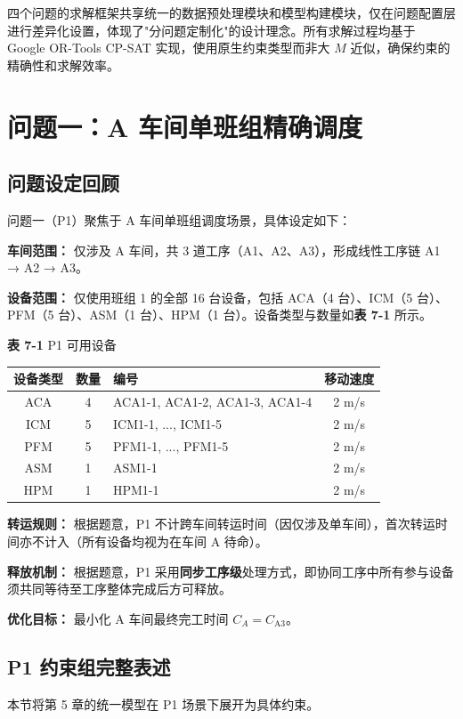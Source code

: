 \documentclass[UTF8,a4paper,12pt]{ctexart}
\begin{document}
四个问题的求解框架共享统一的数据预处理模块和模型构建模块，仅在问题配置层进行差异化设置，体现了"分问题定制化"的设计理念。所有求解过程均基于 Google OR-Tools CP-SAT 实现，使用原生约束类型而非大 $M$ 近似，确保约束的精确性和求解效率。


\section{问题一：A 车间单班组精确调度}

\subsection{问题设定回顾}
问题一（P1）聚焦于 A 车间单班组调度场景，具体设定如下：

\textbf{车间范围：} 仅涉及 A 车间，共 3 道工序（A1、A2、A3），形成线性工序链 A1 → A2 → A3。

\textbf{设备范围：} 仅使用班组 1 的全部 16 台设备，包括 ACA（4 台）、ICM（5 台）、PFM（5 台）、ASM（1 台）、HPM（1 台）。设备类型与数量如\textbf{表 7-1} 所示。

\begin{center}
\textbf{表 7-1} P1 可用设备
\begin{tabular}{cclc}
\toprule
设备类型 & 数量 & 编号 & 移动速度 \\
\midrule
ACA & 4 & ACA1-1, ACA1-2, ACA1-3, ACA1-4 & 2 m/s \\
ICM & 5 & ICM1-1, ..., ICM1-5 & 2 m/s \\
PFM & 5 & PFM1-1, ..., PFM1-5 & 2 m/s \\
ASM & 1 & ASM1-1 & 2 m/s \\
HPM & 1 & HPM1-1 & 2 m/s \\
\bottomrule
\end{tabular}
\end{center}

\textbf{转运规则：} 根据题意，P1 不计跨车间转运时间（因仅涉及单车间），首次转运时间亦不计入（所有设备均视为在车间 A 待命）。

\textbf{释放机制：} 根据题意，P1 采用\textbf{同步工序级}处理方式，即协同工序中所有参与设备须共同等待至工序整体完成后方可释放。

\textbf{优化目标：} 最小化 A 车间最终完工时间 $C_A = C_{\text{A3}}$。

\subsection{P1 约束组完整表述}
本节将第 5 章的统一模型在 P1 场景下展开为具体约束。
\end{document}
